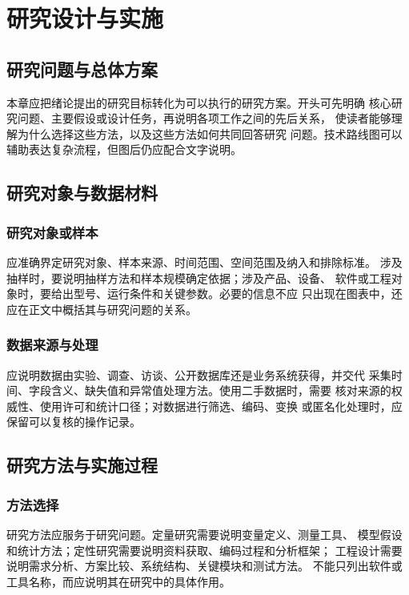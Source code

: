 \chapter{研究设计与实施}

\section{研究问题与总体方案}

本章应把绪论提出的研究目标转化为可以执行的研究方案。开头可先明确
核心研究问题、主要假设或设计任务，再说明各项工作之间的先后关系，
使读者能够理解为什么选择这些方法，以及这些方法如何共同回答研究
问题。技术路线图可以辅助表达复杂流程，但图后仍应配合文字说明。

\section{研究对象与数据材料}

\subsection{研究对象或样本}

应准确界定研究对象、样本来源、时间范围、空间范围及纳入和排除标准。
涉及抽样时，要说明抽样方法和样本规模确定依据；涉及产品、设备、
软件或工程对象时，要给出型号、运行条件和关键参数。必要的信息不应
只出现在图表中，还应在正文中概括其与研究问题的关系。

\subsection{数据来源与处理}

应说明数据由实验、调查、访谈、公开数据库还是业务系统获得，并交代
采集时间、字段含义、缺失值和异常值处理方法。使用二手数据时，需要
核对来源的权威性、使用许可和统计口径；对数据进行筛选、编码、变换
或匿名化处理时，应保留可以复核的操作记录。

\section{研究方法与实施过程}

\subsection{方法选择}

研究方法应服务于研究问题。定量研究需要说明变量定义、测量工具、
模型假设和统计方法；定性研究需要说明资料获取、编码过程和分析框架；
工程设计需要说明需求分析、方案比较、系统结构、关键模块和测试方法。
不能只列出软件或工具名称，而应说明其在研究中的具体作用。

